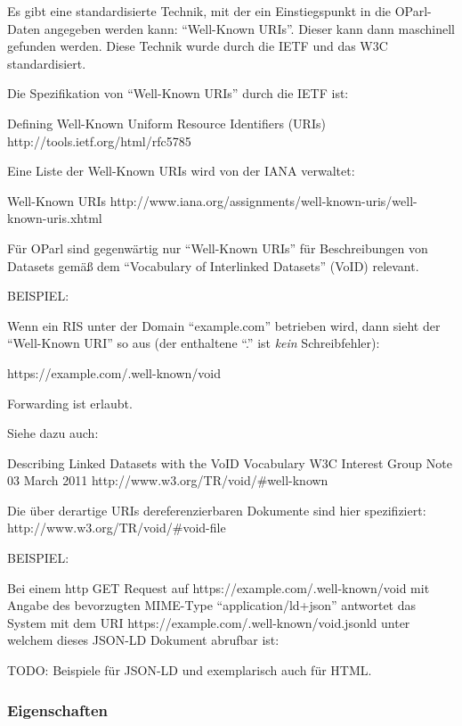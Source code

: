 \documentclass[,a4paper]{article}
\begin{document}
Es gibt eine standardisierte Technik, mit der ein Einstiegspunkt in die
OParl-Daten angegeben werden kann: ``Well-Known URIs''. Dieser kann dann
maschinell gefunden werden. Diese Technik wurde durch die IETF und das
W3C standardisiert.

Die Spezifikation von ``Well-Known URIs'' durch die IETF ist:

Defining Well-Known Uniform Resource Identifiers (URIs)
http://tools.ietf.org/html/rfc5785

Eine Liste der Well-Known URIs wird von der IANA verwaltet:

Well-Known URIs
http://www.iana.org/assignments/well-known-uris/well-known-uris.xhtml

Für OParl sind gegenwärtig nur ``Well-Known URIs'' für Beschreibungen
von Datasets gemäß dem ``Vocabulary of Interlinked Datasets'' (VoID)
relevant.

BEISPIEL:

Wenn ein RIS unter der Domain ``example.com'' betrieben wird, dann sieht
der ``Well-Known URI'' so aus (der enthaltene ``.'' ist \emph{kein}
Schreibfehler):

https://example.com/.well-known/void

Forwarding ist erlaubt.

Siehe dazu auch:

Describing Linked Datasets with the VoID Vocabulary W3C Interest Group
Note 03 March 2011 http://www.w3.org/TR/void/\#well-known

Die über derartige URIs dereferenzierbaren Dokumente sind hier
spezifiziert: http://www.w3.org/TR/void/\#void-file

BEISPIEL:

Bei einem http GET Request auf https://example.com/.well-known/void mit
Angabe des bevorzugten MIME-Type ``application/ld+json'' antwortet das
System mit dem URI https://example.com/.well-known/void.jsonld unter
welchem dieses JSON-LD Dokument abrufbar ist:

TODO: Beispiele für JSON-LD und exemplarisch auch für HTML.

\subsubsection{Eigenschaften}\label{eigenschaften}
\end{document}
